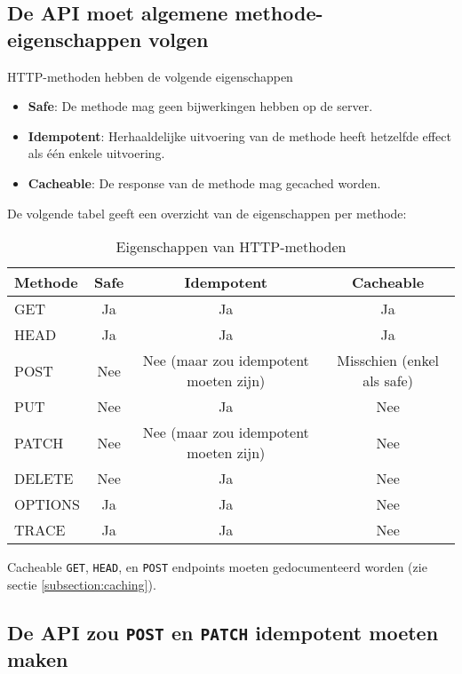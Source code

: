 \subsection{De API moet algemene methode-eigenschappen volgen}
\label{subsection:algemene_methode_eigenschappen}

HTTP-methoden hebben de volgende eigenschappen \autocite{rfc9110}

\begin{itemize}
    \item \textbf{Safe}: De methode mag geen bijwerkingen hebben op de server.
    \item \textbf{Idempotent}: Herhaaldelijke uitvoering van de methode heeft hetzelfde effect als één enkele uitvoering.
    \item \textbf{Cacheable}: De response van de methode mag gecached worden.
\end{itemize}

De volgende tabel geeft een overzicht van de eigenschappen per methode:

\begin{table}[H]
\centering
\begin{tabular}{|l|c|c|c|}
\hline
Methode & Safe & Idempotent & Cacheable \\
\hline
GET     & Ja  & Ja  & Ja  \\
HEAD    & Ja  & Ja  & Ja  \\
POST    & Nee & Nee (maar zou idempotent moeten zijn) & Misschien (enkel als safe) \\
PUT     & Nee & Ja  & Nee \\
PATCH   & Nee & Nee (maar zou idempotent moeten zijn) & Nee \\
DELETE  & Nee & Ja  & Nee \\
OPTIONS & Ja  & Ja  & Nee \\
TRACE   & Ja  & Ja  & Nee \\
\hline
\end{tabular}
\caption{Eigenschappen van HTTP-methoden}
\label{tab:http_method_properties}
\end{table}

Cacheable \texttt{GET}, \texttt{HEAD}, en \texttt{POST} endpoints moeten gedocumenteerd worden (zie sectie \ref{subsection:caching}).

\subsection{De API zou \texttt{POST} en \texttt{PATCH} idempotent moeten maken}
\label{subsection:idempotente_post_patch}

